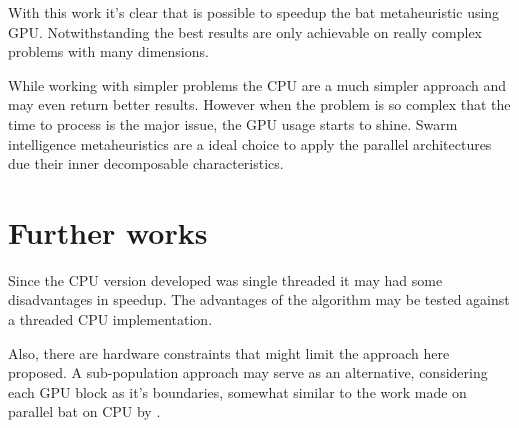 \documentclass[conference]{IEEEtran}
\begin{document}
With this work it's clear that is possible to speedup the bat
metaheuristic using GPU. Notwithstanding the best results are only
achievable on really complex problems with many dimensions.

While working with simpler problems the CPU are a much simpler approach
and may even return better results. However when the problem is so
complex that the time to process is the major issue, the GPU usage
starts to shine. Swarm intelligence metaheuristics are a ideal choice to
apply the parallel architectures due their inner decomposable characteristics.

\section{Further works} %

Since the CPU version developed was single threaded it may had some
disadvantages in speedup. The advantages of the algorithm may be tested
against a threaded CPU implementation.

Also, there are hardware constraints that might limit the approach
here proposed. A sub-population approach may serve as an alternative,
considering each GPU block as it's boundaries, somewhat similar to the
work made on parallel bat on CPU by \cite{paralellCPU}.

\end{document}
